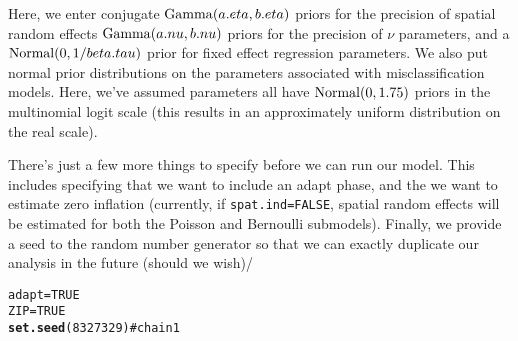 \documentclass{article}\usepackage{graphicx, color}
\makeatletter
\newcommand{\hlfunctioncall}[1]{\textcolor[rgb]{0.501960784313725,0,0.329411764705882}{\textbf{#1}}}%
\newcommand{\hlcomment}[1]{\textcolor[rgb]{0.180392156862745,0.6,0.341176470588235}{#1}}%
\newenvironment{kframe}{%
 \def\at@end@of@kframe{}%
 \ifinner\ifhmode%
  \def\at@end@of@kframe{\end{minipage}}%
  \begin{minipage}{\columnwidth}%
 \fi\fi%
 \def\FrameCommand##1{\hskip\@totalleftmargin \hskip-\fboxsep
 \colorbox{shadecolor}{##1}\hskip-\fboxsep
     \hskip-\linewidth \hskip-\@totalleftmargin \hskip\columnwidth}%
 \MakeFramed {\advance\hsize-\width
   \@totalleftmargin\z@ \linewidth\hsize
   \@setminipage}}%
 {\par\unskip\endMakeFramed%
 \at@end@of@kframe}
\newenvironment{knitrout}{}{} %
\makeatother
\begin{document}
Here, we enter conjugate ${\rm Gamma}(a.eta,b.eta)$ priors for the precision of spatial random effects ${\rm Gamma}(a.nu,b.nu)$ priors for the precision of $\nu$ parameters, and a ${\rm Normal}(0,1/beta.tau)$ prior for fixed effect regression parameters.  We also put normal prior distributions on the parameters associated with misclassification models.  Here, we've assumed parameters all have ${\rm Normal}(0,1.75)$ priors in the multinomial logit scale (this results in an approximately uniform distribution on the real scale).

There's just a few more things to specify before we can run our model.  This includes specifying that we want to include an adapt phase, and the we want to
estimate zero inflation (currently, if \texttt{spat.ind=FALSE}, spatial random effects will be estimated for both the Poisson and Bernoulli submodels).  Finally, we provide a seed to the random number generator so that we can exactly duplicate our analysis in the future (should we wish)/
\begin{knitrout}
\color{fgcolor}\begin{kframe}
\begin{alltt}
adapt = TRUE
ZIP = TRUE
\hlfunctioncall{set.seed}(8327329)  \hlcomment{#chain1}
\end{alltt}
\end{kframe}
\end{knitrout}
\end{document}
